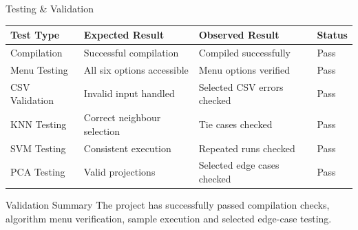 \documentclass[aspectratio=169,11pt]{beamer}
\begin{document}
\begin{frame}{Testing \& Validation}

\scriptsize

\begin{center}

\renewcommand{\arraystretch}{1.35}

\begin{tabularx}{.96\textwidth}
{@{}p{2.0cm}X X p{1.4cm}@{}}

\toprule
Test Type &
Expected Result &
Observed Result &
Status\\
\midrule

{Compilation} &
{Successful compilation} &
{Compiled successfully} &
Pass\\

{Menu Testing} &
{All six options accessible} &
{Menu options verified} &
Pass\\

{CSV Validation} &
{Invalid input handled} &
{Selected CSV errors checked} &
Pass\\

{KNN Testing} &
{Correct neighbour selection} &
{Tie cases checked} &
Pass\\

{SVM Testing} &
{Consistent execution} &
{Repeated runs checked} &
Pass\\

{PCA Testing} &
{Valid projections} &
{Selected edge cases checked} &
Pass\\

\bottomrule

\end{tabularx}

\end{center}

\vspace{3mm}

\begin{block}{Validation Summary}
{
The project has successfully passed compilation checks, algorithm menu verification, sample execution and selected edge-case testing.
}
\end{block}

\end{frame}
\end{document}
